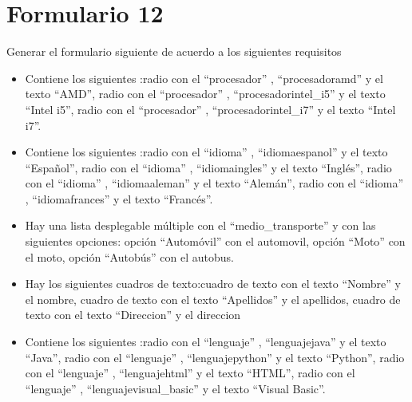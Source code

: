 \documentclass[letterpaper,10pt,spanish]{sphinxmanual}
\begin{document}
\section{Formulario 12}
\label{ejercicios/formularios/anexo_formularios:formulario-12}
Generar el formulario siguiente de acuerdo a los siguientes requisitos
\begin{itemize}
\item {} 
Contiene los siguientes :radio con el   ``procesador'' ,   ``procesadoramd''  y el texto ``AMD'', radio con el   ``procesador'' ,   ``procesadorintel\_i5''  y el texto ``Intel i5'', radio con el   ``procesador'' ,   ``procesadorintel\_i7''  y el texto ``Intel i7''.

\item {} 
Contiene los siguientes :radio con el   ``idioma'' ,   ``idiomaespanol''  y el texto ``Español'', radio con el   ``idioma'' ,   ``idiomaingles''  y el texto ``Inglés'', radio con el   ``idioma'' ,   ``idiomaaleman''  y el texto ``Alemán'', radio con el   ``idioma'' ,   ``idiomafrances''  y el texto ``Francés''.

\item {} 
Hay una lista desplegable múltiple con el  ``medio\_transporte'' y con las siguientes opciones: opción ``Automóvil'' con el  automovil, opción ``Moto'' con el  moto, opción ``Autobús'' con el  autobus.

\item {} 
Hay los siguientes cuadros de texto:cuadro de texto con el texto ``Nombre'' y el  nombre, cuadro de texto con el texto ``Apellidos'' y el  apellidos, cuadro de texto con el texto ``Direccion'' y el  direccion

\item {} 
Contiene los siguientes :radio con el   ``lenguaje'' ,   ``lenguajejava''  y el texto ``Java'', radio con el   ``lenguaje'' ,   ``lenguajepython''  y el texto ``Python'', radio con el   ``lenguaje'' ,   ``lenguajehtml''  y el texto ``HTML'', radio con el   ``lenguaje'' ,   ``lenguajevisual\_basic''  y el texto ``Visual Basic''.


\end{itemize}
\end{document}
